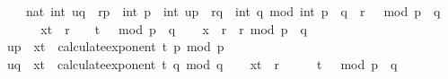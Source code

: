 \begin{isabellebody}
\ \ \ \ nat\ {\isacharparenleft}{\kern0pt}{\isacharparenleft}{\kern0pt}int\ u{\isacharunderscore}{\kern0pt}q\ {\isacharasterisk}{\kern0pt}\ r{\isacharunderscore}{\kern0pt}p\ {\isacharasterisk}{\kern0pt}\ int\ p\ {\isacharplus}{\kern0pt}\ int\ u{\isacharunderscore}{\kern0pt}p\ {\isacharasterisk}{\kern0pt}\ r{\isacharunderscore}{\kern0pt}q\ {\isacharasterisk}{\kern0pt}\ int\ q{\isacharparenright}{\kern0pt}\ mod\ int\ {\isacharparenleft}{\kern0pt}p\ {\isacharasterisk}{\kern0pt}\ q{\isacharparenright}{\kern0pt}{\isacharparenright}{\kern0pt}{\isacharparenright}{\kern0pt}\ {\isacharequal}{\kern0pt}\ {\isacharparenleft}{\kern0pt}r\ {\isacharcircum}{\kern0pt}\ {}{\isacharparenright}{\kern0pt}\ mod\ {\isacharparenleft}{\kern0pt}p\ {\isacharasterisk}{\kern0pt}\ q{\isacharparenright}{\kern0pt}{\isachardoublequoteclose}\isanewline
%
\isadelimproof
%
\endisadelimproof
%
\isatagproof
{}\isamarkupfalse%
\ {\isacharminus}{\kern0pt}\ \isanewline
\ \ \isamarkupfalse%
\ {\isacharquery}{\kern0pt}xt\ {\isacharequal}{\kern0pt}\ {\isachardoublequoteopen}r\ {\isacharcircum}{\kern0pt}\ {\isacharparenleft}{\kern0pt}{}\ {\isacharcircum}{\kern0pt}\ {\isacharparenleft}{\kern0pt}t\ {\isacharplus}{\kern0pt}\ {}{\isacharparenright}{\kern0pt}{\isacharparenright}{\kern0pt}\ mod\ {\isacharparenleft}{\kern0pt}p\ {\isacharasterisk}{\kern0pt}\ q{\isacharparenright}{\kern0pt}{\isachardoublequoteclose}\isanewline
\ \ \isamarkupfalse%
\ {\isacharquery}{\kern0pt}x{}\ {\isacharequal}{\kern0pt}\ {\isachardoublequoteopen}{\isacharparenleft}{\kern0pt}r\ {\isacharasterisk}{\kern0pt}\ r{\isacharparenright}{\kern0pt}\ mod\ p\ {\isacharasterisk}{\kern0pt}\ q{\isachardoublequoteclose}\isanewline
\ \ \isamarkupfalse%
\ {\isacharquery}{\kern0pt}up\ {\isacharequal}{\kern0pt}\ {\isachardoublequoteopen}{\isacharquery}{\kern0pt}xt\ {\isacharcircum}{\kern0pt}\ {\isacharparenleft}{\kern0pt}calculate{\isacharunderscore}{\kern0pt}exponent\ t\ p{\isacharparenright}{\kern0pt}\ mod\ p{\isachardoublequoteclose}\isanewline
\ \ \isamarkupfalse%
\ {\isacharquery}{\kern0pt}uq\ {\isacharequal}{\kern0pt}\ {\isachardoublequoteopen}{\isacharquery}{\kern0pt}xt\ {\isacharcircum}{\kern0pt}\ {\isacharparenleft}{\kern0pt}calculate{\isacharunderscore}{\kern0pt}exponent\ t\ q{\isacharparenright}{\kern0pt}\ mod\ q{\isachardoublequoteclose}\isanewline
\isanewline
\isanewline
\isanewline
\ \ \isamarkupfalse%
\ {\isachardoublequoteopen}{\isacharquery}{\kern0pt}xt\ {\isacharequal}{\kern0pt}\ r\ {\isacharcircum}{\kern0pt}\ {\isacharparenleft}{\kern0pt}{}\ {\isacharasterisk}{\kern0pt}\ {}\ {\isacharcircum}{\kern0pt}\ {\isacharparenleft}{\kern0pt}t\ {\isacharplus}{\kern0pt}\ {}{\isacharparenright}{\kern0pt}{\isacharparenright}{\kern0pt}\ mod\ {\isacharparenleft}{\kern0pt}p\ {\isacharasterisk}{\kern0pt}\ q{\isacharparenright}{\kern0pt}{\isachardoublequoteclose}\ \isamarkupfalse%

\end{isabellebody}
